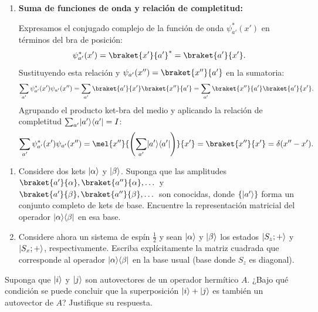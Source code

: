 \begin{resolucion}
\begin{enumerate}
  \item \textbf{Suma de funciones de onda y relación de completitud:}

  Expresamos el conjugado complejo de la función de onda $\psi_{a'}^*(x')$ en términos del bra de posición:
  \[
  \psi_{a'}^*(x') = \braket{x'}{a'}^* = \braket{a'}{x'}.
  \]
  Sustituyendo esta relación y $\psi_{a'}(x'') = \braket{x''}{a'}$ en la sumatoria:
  \[
  \sum_{a'} \psi_{a'}^*(x') \psi_{a'}(x'') = \sum_{a'} \braket{a'}{x'} \braket{x''}{a'} = \sum_{a'} \braket{x''}{a'} \braket{a'}{x'}.
  \]
  Agrupando el producto ket-bra del medio y aplicando la relación de completitud $\sum_{a'} \lvert a'\rangle\langle a'\rvert = I$:
  \[
  \sum_{a'} \psi_{a'}^*(x') \psi_{a'}(x'') = \mel{x''}{\left( \sum_{a'} \ket{a'}\bra{a'} \right)}{x'} = \braket{x''}{x'} = \delta(x'' - x').
  \]
\end{enumerate}
\end{resolucion}

\begin{enunciado}
\begin{enumerate}
  \item Considere dos kets $\lvert\alpha\rangle$ y $\lvert\beta\rangle$. Suponga que las amplitudes $\braket{a'}{\alpha}, \braket{a''}{\alpha}, \dots$ y $\braket{a'}{\beta}, \braket{a''}{\beta}, \dots$ son conocidas, donde $\{\lvert a'\rangle\}$ forma un conjunto completo de kets de base. Encuentre la representación matricial del operador $\lvert\alpha\rangle\langle\beta\rvert$ en esa base.
  \item Considere ahora un sistema de espín $\frac{1}{2}$ y sean $\lvert\alpha\rangle$ y $\lvert\beta\rangle$ los estados $\lvert S_z; +\rangle$ y $\lvert S_x; +\rangle$, respectivamente. Escriba explícitamente la matriz cuadrada que corresponde al operador $\lvert\alpha\rangle\langle\beta\rvert$ en la base usual (base donde $S_z$ es diagonal).
\end{enumerate}
\end{enunciado}

\begin{enunciado}
Suponga que $\lvert i\rangle$ y $\lvert j\rangle$ son autovectores de un operador hermítico $A$. ¿Bajo qué condición se puede concluir que la superposición $\lvert i\rangle + \lvert j\rangle$ es también un autovector de $A$? Justifique su respuesta.
\end{enunciado}

